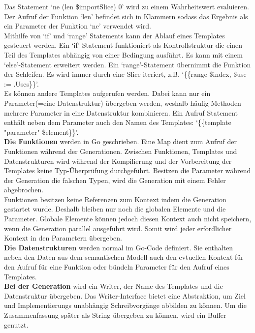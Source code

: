 \documentclass[./einleitung.tex]{subfiles}
\begin{document}
    Das Statement `ne (len \$importSlice) 0' wird zu einem Wahrheitswert evaluieren.
    Der Aufruf der Funktion `len' befindet sich in Klammern sodass das Ergebnis als ein Parameter der Funktion `ne' verwendet wird.\\
    Mithilfe von `if' und `range' Statements kann der Ablauf eines Templates gesteuert werden.
    Ein `if'-Statement funktioniert als Kontrollstruktur die einen Teil des Templates abhängig von einer Bedingung ausführt.
    Es kann mit einem `else'-Statement erweitert werden.
    Ein `range'-Statement übernimmt die Funktion der Schleifen.
    Es wird immer durch eine Slice iteriert, z.B. `\{\{range \$index, \$use := .Uses\}\}'.\\
    Es können andere Templates aufgerufen werden.
    Dabei kann nur ein Parameter(=eine Datenstruktur) übergeben werden, weshalb häufig Methoden mehrere Parameter in eine Datenstruktur kombinieren.
    Ein Aufruf Statement enthält neben dem Parameter auch den Namen des Templates: `\{\{template "parameter" \$element\}\}'.
    \\
    \textbf{Die Funktionen} werden in Go geschrieben.
    Eine Map dient zum Aufruf der Funktionen während der Generationen.
    Zwischen Funktionen, Templates und Datenstrukturen wird während der Kompilierung und der Vorbereitung der Templates keine Typ-Überprüfung durchgeführt.
    Besitzen die Parameter während der Generation die falschen Typen, wird die Generation mit einem Fehler abgebrochen.\\
    Funktionen besitzen keine Referenzen zum Kontext indem die Generation gestartet wurde.
    Deshalb bleiben nur noch die globalen Elemente und die Parameter.
    Globale Elemente können jedoch diesen Kontext auch nicht speichern, wenn die Generation parallel ausgeführt wird.
    Somit wird jeder erfordlicher Kontext in den Parametern übergeben.
    \\
    \textbf{Die Datenstrukturen} werden normal im Go-Code definiert.
    Sie enthalten neben den Daten aus dem semantischen Modell auch den evtuellen Kontext für den Aufruf für eine Funktion oder bündeln Parameter für den Aufruf eines Templates.
    \\
    \textbf{Bei der Generation} wird ein Writer, der Name des Templates und die Datenstruktur übergeben.
    Das Writer-Interface bietet eine Abstraktion, um Ziel und Implementierungs unabhängig Schreibvorgänge abbilden zu können.
    Um die Zusammenfassung später als String übergeben zu können, wird ein Buffer genutzt.
    \\\\
\end{document}
